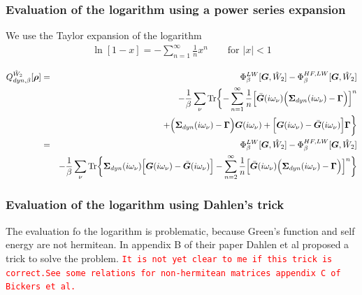 \documentclass[11pt,a4paper]{report}
\newcommand{\petertt}[1]{\textcolor{red}{\texttt{#1}}}
\begin{document}
\subsubsection{Evaluation of the logarithm using a power series expansion}
We use the Taylor expansion of the logarithm
\begin{eqnarray}
\ln[1-x]=-\sum_{n=1}^\infty \frac{1}{n}x^n \qquad\text{for $|x|<1$}
\end{eqnarray}


\begin{eqnarray}
Q^{\hat{W}_2}_{dyn,\beta}[\bm{\rho}]
&=&
\Phi^{LW}_\beta[\bm{G},\hat{W}_2]-\Phi^{HF,LW}_\beta[\bm{G},\hat{W}_2]
\nonumber\\
&&-\frac{1}{\beta}\sum_\nu\mathrm{Tr}\biggl\lbrace
-\sum_{n=1}^\infty\frac{1}{n}
\Bigl[\bar{\bm{G}}(i\omega_\nu)
\Bigl(\bm{\Sigma}_{dyn}(i\omega_\nu)-\bm{\Gamma}\Bigr)
\Bigr]^n
\nonumber\\&&
+\Bigl(\bm{\Sigma}_{dyn}(i\omega_\nu)-\bm{\Gamma}\Bigr)\bm{G}(i\omega_\nu)
+
\Bigl[\bm{G}(i\omega_\nu)-\bar{\bm{G}}(i\omega_\nu)\Bigr]
\bm{\Gamma}
\biggr\rbrace
\nonumber\\
&=&
\Phi^{LW}_\beta[\bm{G},\hat{W}_2]-\Phi^{HF,LW}_\beta[\bm{G},\hat{W}_2]
\nonumber\\
&&-\frac{1}{\beta}\sum_\nu\mathrm{Tr}\biggl\lbrace
\bm{\Sigma}_{dyn}(i\omega_\nu)
\Bigl[\bm{G}(i\omega_\nu)-\bar{\bm{G}}(i\omega_\nu)\Bigr]
-\sum_{n=2}^\infty\frac{1}{n}
\Bigl[\bar{\bm{G}}(i\omega_\nu)
\Bigl(\bm{\Sigma}_{dyn}(i\omega_\nu)-\bm{\Gamma}\Bigr)
\Bigr]^n
\biggr\rbrace
\nonumber\\
\label{eq:dmf1greenenergypower}
\end{eqnarray}

\subsubsection{Evaluation of the logarithm using Dahlen's trick}
\label{sec:dahlenstrick}
The evaluation fo the logarithm is problematic, because Green's
function and self energy are not hermitean. In appendix B of their
paper\cite{dahlen06_pra73_12511} Dahlen et al proposed a trick to
solve the problem. \petertt{It is not yet clear to me if this trick is
  correct.}\petertt{See some relations for non-hermitean matrices
  appendix C of Bickers et al.\cite{bickers89_ap193_206}}
\end{document}
